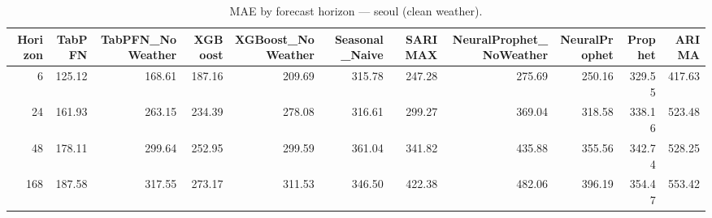 \begin{table}[ht!]
\centering
\caption{MAE by forecast horizon — seoul (clean weather).}
\label{tab:mae_by_horizon_seoul}
\begin{tabular}{rrrrrrrrrrr}
\toprule
Horizon & TabPFN & TabPFN\_NoWeather & XGBoost & XGBoost\_NoWeather & Seasonal\_Naive & SARIMAX & NeuralProphet\_NoWeather & NeuralProphet & Prophet & ARIMA \\
\midrule
6 & 125.12 & 168.61 & 187.16 & 209.69 & 315.78 & 247.28 & 275.69 & 250.16 & 329.55 & 417.63 \\
24 & 161.93 & 263.15 & 234.39 & 278.08 & 316.61 & 299.27 & 369.04 & 318.58 & 338.16 & 523.48 \\
48 & 178.11 & 299.64 & 252.95 & 299.59 & 361.04 & 341.82 & 435.88 & 355.56 & 342.74 & 528.25 \\
168 & 187.58 & 317.55 & 273.17 & 311.53 & 346.50 & 422.38 & 482.06 & 396.19 & 354.47 & 553.42 \\
\bottomrule
\end{tabular}
\end{table}
